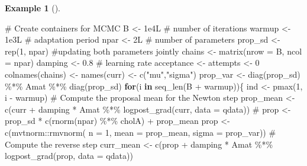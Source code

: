 \documentclass[
  11pt,
  letterpaper,
]{scrbook}
\newenvironment{Shaded}{\begin{snugshade}}{\end{snugshade}}
\newcommand{\AttributeTok}[1]{\textcolor[rgb]{0.40,0.45,0.13}{#1}}
\newcommand{\CommentTok}[1]{\textcolor[rgb]{0.37,0.37,0.37}{#1}}
\newcommand{\ControlFlowTok}[1]{\textcolor[rgb]{0.00,0.23,0.31}{\textbf{#1}}}
\newcommand{\DecValTok}[1]{\textcolor[rgb]{0.68,0.00,0.00}{#1}}
\newcommand{\FloatTok}[1]{\textcolor[rgb]{0.68,0.00,0.00}{#1}}
\newcommand{\FunctionTok}[1]{\textcolor[rgb]{0.28,0.35,0.67}{#1}}
\newcommand{\NormalTok}[1]{\textcolor[rgb]{0.00,0.23,0.31}{#1}}
\newcommand{\OtherTok}[1]{\textcolor[rgb]{0.00,0.23,0.31}{#1}}
\newcommand{\SpecialCharTok}[1]{\textcolor[rgb]{0.37,0.37,0.37}{#1}}
\newcommand{\StringTok}[1]{\textcolor[rgb]{0.13,0.47,0.30}{#1}}
\theoremstyle{definition}
\newtheorem{example}{Example}[chapter]
\theoremstyle{plain}
\theoremstyle{plain}
\theoremstyle{plain}
\theoremstyle{definition}
\theoremstyle{definition}
\theoremstyle{plain}
\theoremstyle{plain}
\theoremstyle{remark}
\begin{document}
\begin{example}[]
\begin{Shaded}
\begin{Highlighting}[]
\CommentTok{\# Create containers for MCMC}
\NormalTok{B }\OtherTok{\textless{}{-}} \FloatTok{1e4}\NormalTok{L }\CommentTok{\# number of iterations}
\NormalTok{warmup }\OtherTok{\textless{}{-}} \FloatTok{1e3}\NormalTok{L }\CommentTok{\# adaptation period}
\NormalTok{npar }\OtherTok{\textless{}{-}} \DecValTok{2}\NormalTok{L }\CommentTok{\# number of parameters}
\NormalTok{prop\_sd }\OtherTok{\textless{}{-}} \FunctionTok{rep}\NormalTok{(}\DecValTok{1}\NormalTok{, npar) }\CommentTok{\#updating both parameters jointly}
\NormalTok{chains }\OtherTok{\textless{}{-}} \FunctionTok{matrix}\NormalTok{(}\AttributeTok{nrow =}\NormalTok{ B, }\AttributeTok{ncol =}\NormalTok{ npar)}
\NormalTok{damping }\OtherTok{\textless{}{-}} \FloatTok{0.8} \CommentTok{\# learning rate}
\NormalTok{acceptance }\OtherTok{\textless{}{-}}\NormalTok{ attempts }\OtherTok{\textless{}{-}} \DecValTok{0} 
\FunctionTok{colnames}\NormalTok{(chains) }\OtherTok{\textless{}{-}} \FunctionTok{names}\NormalTok{(curr) }\OtherTok{\textless{}{-}} \FunctionTok{c}\NormalTok{(}\StringTok{"mu"}\NormalTok{,}\StringTok{"sigma"}\NormalTok{)}
\NormalTok{prop\_var }\OtherTok{\textless{}{-}} \FunctionTok{diag}\NormalTok{(prop\_sd) }\SpecialCharTok{\%*\%}\NormalTok{ Amat }\SpecialCharTok{\%*\%} \FunctionTok{diag}\NormalTok{(prop\_sd)}
\ControlFlowTok{for}\NormalTok{(i }\ControlFlowTok{in} \FunctionTok{seq\_len}\NormalTok{(B }\SpecialCharTok{+}\NormalTok{ warmup))\{}
\NormalTok{  ind }\OtherTok{\textless{}{-}} \FunctionTok{pmax}\NormalTok{(}\DecValTok{1}\NormalTok{, i }\SpecialCharTok{{-}}\NormalTok{ warmup)}
  \CommentTok{\# Compute the proposal mean for the Newton step}
\NormalTok{  prop\_mean }\OtherTok{\textless{}{-}} \FunctionTok{c}\NormalTok{(curr }\SpecialCharTok{+}\NormalTok{ damping }\SpecialCharTok{*} 
\NormalTok{     Amat }\SpecialCharTok{\%*\%} \FunctionTok{logpost\_grad}\NormalTok{(curr, }\AttributeTok{data =}\NormalTok{ qdata))}
  \CommentTok{\# prop \textless{}{-} prop\_sd * c(rnorm(npar) \%*\% cholA) + prop\_mean}
\NormalTok{  prop }\OtherTok{\textless{}{-}} \FunctionTok{c}\NormalTok{(mvtnorm}\SpecialCharTok{::}\FunctionTok{rmvnorm}\NormalTok{(}
    \AttributeTok{n =} \DecValTok{1}\NormalTok{,}
    \AttributeTok{mean =}\NormalTok{ prop\_mean, }
    \AttributeTok{sigma =}\NormalTok{ prop\_var))}
  \CommentTok{\# Compute the reverse step}
\NormalTok{  curr\_mean }\OtherTok{\textless{}{-}} \FunctionTok{c}\NormalTok{(prop }\SpecialCharTok{+}\NormalTok{ damping }\SpecialCharTok{*} 
\NormalTok{     Amat }\SpecialCharTok{\%*\%} \FunctionTok{logpost\_grad}\NormalTok{(prop, }\AttributeTok{data =}\NormalTok{ qdata))}

\end{Highlighting}
\end{Shaded}
\end{example}
\end{document}
